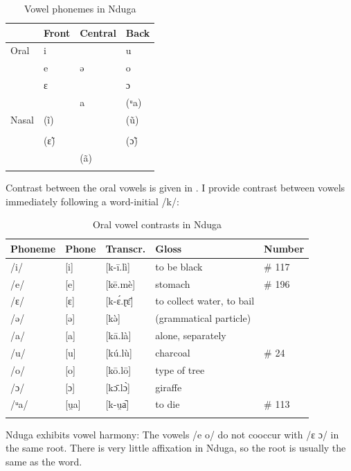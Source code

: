 \documentclass[output=paper,colorlinks,citecolor=brown
]{langscibook}
\begin{document}
\begin{table}
\caption{Vowel phonemes in Nduga}
\label{tab:olson:vowels}
 \begin{tabular}{llll}
  \lsptoprule
            & Front & Central & Back\\
  \midrule
  Oral  & i &     & u \\
        & e & ə & o \\
        & ɛ &     & ɔ \\
        &   & a   & (ᵘa) \\
  \midrule
  Nasal & (ĩ) &     & (ũ) \\
        &   &     & \\
        & (ɛ̃) &     & (ɔ̃) \\
        &   & (ã)   & \\            
  \lspbottomrule
 \end{tabular}
\end{table}

Contrast between the oral vowels is given in . I provide contrast between vowels immediately following a word-initial /k/:

\begin{table}
\caption{Oral vowel contrasts in Nduga}
\label{tab:olson:vowelcontrasts}
 \begin{tabular}{lllll}
  \lsptoprule
Phoneme & Phone & Transcr. & Gloss & Number \\
  \midrule
/i/ & [i] & [k-ī.lì] & to be black & \# 117 \\
/e/ & [e] & [kē.mè] & stomach & \# 196 \\
/ɛ/ & [ɛ] & [k-ɛ́.ɽɛ̄] & to collect water, to bail & \\
/ə/ & [ə] & [kə̀] & (grammatical particle) & \\
/a/ & [a] & [kā.là] & alone, separately & \\
/u/ & [u] & [kú.lù] & charcoal & \# 24 \\
/o/ & [o] & [kō.lō] & type of tree & \\
/ɔ/ & [ɔ] & [kɔ̄.lɔ̀] & giraffe & \\
/ᵘa/ & [u̯a] & [k-u̯a᷆] & to die & \# 113 \\
  \lspbottomrule
 \end{tabular}
\end{table}

Nduga exhibits vowel harmony: The vowels /e o/ do not cooccur with /ɛ ɔ/ in the same root. There is very little affixation in Nduga, so the root is usually the same as the word.
\end{document}
